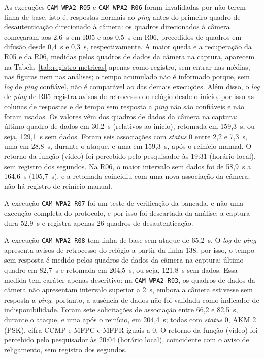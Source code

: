 As execuções \texttt{CAM\_WPA2\_R05} e \texttt{CAM\_WPA2\_R06} foram invalidadas por não terem linha de base, isto é, respostas normais ao \textit{ping} antes do primeiro quadro de desautenticação direcionado à câmera: os quadros direcionados à câmera começaram aos 2,6~s em R05 e aos 0,5~s em R06, precedidos de quadros em difusão desde 0,4~s e 0,3~s, respectivamente. A maior queda e a recuperação da R05 e da R06, medidas pelos quadros de dados da câmera na captura, aparecem na Tabela~\ref{tab:registro-metricas} apenas como registro, sem entrar nas médias, nas figuras nem nas análises; o tempo acumulado não é informado porque, sem \textit{log} de \textit{ping} confiável, não é comparável ao das demais execuções. Além disso, o \textit{log} de \textit{ping} de R05 registra avisos de retrocesso do relógio desde o início, por isso as colunas de respostas e de tempo sem resposta a \textit{ping} não são confiáveis e não foram usadas. Os valores vêm dos quadros de dados da câmera na captura: último quadro de dados em 30,2~s (relativos ao início), retomada em 159,3~s, ou seja, 129,1~s sem dados. Foram seis associações com \textit{status} 0 entre 2,2 e 7,3~s, uma em 28,8~s, durante o ataque, e uma em 159,3~s, após o reinício manual. O retorno da função (vídeo) foi percebido pelo pesquisador às 19:31 (horário local), sem registro dos segundos. Na R06, o maior intervalo sem dados foi de 58,9~s a 164,6~s (105,7~s), e a retomada coincidiu com uma nova associação da câmera; não há registro de reinício manual.

A execução \texttt{CAM\_WPA2\_R07} foi um teste de verificação da bancada, e não uma execução completa do protocolo, e por isso foi descartada da análise; a captura dura 52,9~s e registra apenas 26 quadros de desautenticação.

A execução \texttt{CAM\_WPA2\_R08} tem linha de base sem ataque de 65,2~s. O \textit{log} de \textit{ping} apresenta avisos de retrocesso do relógio a partir da linha 138; por isso, o tempo sem resposta é medido pelos quadros de dados da câmera na captura: último quadro em 82,7~s e retomada em 204,5~s, ou seja, 121,8~s sem dados. Essa medida tem caráter apenas descritivo: na \texttt{CAM\_WPA2\_R03}, os quadros de dados da câmera não apresentam intervalo superior a 2~s, embora a câmera estivesse sem resposta a \textit{ping}; portanto, a ausência de dados não foi validada como indicador de indisponibilidade. Foram sete solicitações de associação entre 66,2 e 82,5~s, durante o ataque, e uma após o reinício, em 204,4~s; todas com \textit{status} 0, AKM 2 (PSK), cifra CCMP e MFPC e MFPR iguais a 0. O retorno da função (vídeo) foi percebido pelo pesquisador às 20:04 (horário local), coincidente com o aviso de religamento, sem registro dos segundos.


